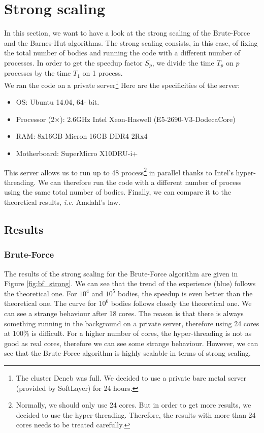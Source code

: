 \documentclass[10pt,a4paper]{article}
\begin{document}
\section{Strong scaling}

In this section, we want to have a look at the strong scaling of the Brute-Force and the Barnes-Hut algorithms. The strong scaling consists, in this case, of fixing the total number of bodies and running the code with a different number of processes. In order to get the speedup factor $S_p$, we divide the time $T_p$ on $p$ processes by the time $T_1$ on 1 process.
\\
We ran the code on a private server\footnote{The cluster Deneb was full. We decided to use a private bare metal server (provided by SoftLayer) for 24 hours.} Here are the specificities of the server:
\begin{itemize}
\item OS: Ubuntu 14.04, 64- bit.
\item Processor (2$\times$): 2.6GHz Intel Xeon-Haswell (E5-2690-V3-DodecaCore)
\item RAM: 8x16GB Micron 16GB DDR4 2Rx4
\item Motherboard: SuperMicro X10DRU-i+
\end{itemize}
This server allows us to run up to 48 process\footnote{Normally, we should only use 24 cores. But in order to get more results, we decided to use the hyper-threading. Therefore, the results with more than 24 cores needs to be treated carefully.} in parallel thanks to Intel's hyper-threading. We can therefore run the code with a different number of process using the same total number of bodies. Finally, we can compare it to the theoretical results, {\it i.e.} Amdahl's law. 

\subsection{Results}

\subsubsection{Brute-Force}

The results of the strong scaling for the Brute-Force algorithm are given in Figure \ref{fig:bf_strong}. We can see that the trend of the experience (blue) follows the theoretical one. For $10^4$ and $10^5$ bodies, the speedup is even better than the theoretical one. The curve for $10^6$ bodies follows closely the theoretical one. We can see a strange behaviour after 18 cores. The reason is that there is always something running in the background on a private server, therefore using 24 cores at 100\% is difficult. For a higher number of cores, the hyper-threading is not as good as real cores, therefore we can see some strange behaviour. However, we can see that the Brute-Force algorithm is highly scalable in terms of strong scaling.
\end{document}
